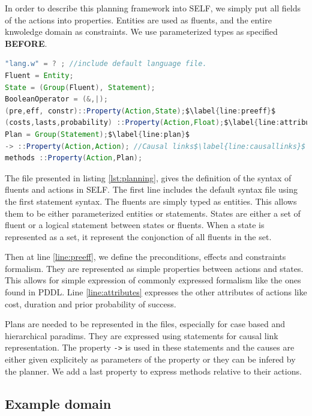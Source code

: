 \documentclass[11pt,a4paper,twoside,openright,titlepage,numbers=noenddot,headinclude,cleardoublepage=empty,openany]{scrreprt}
\theoremstyle{plain}
\theoremstyle{definition}
\theoremstyle{remark}
\newcommand{\passthrough}[1]{#1}
\begin{document}
In order to describe this planning framework into SELF, we simply put
all fields of the actions into properties. Entities are used as fluents,
and the entire knwoledge domain as constraints. We use parameterized
types as specified \textbf{BEFORE}.

\begin{lstlisting}[language=Java, caption={Content of the file "planning.w"}, escapechar={$}, label=lst:planning]
"lang.w" = ? ; //include default language file.
Fluent = Entity;
State = (Group(Fluent), Statement);
BooleanOperator = (&,|);
(pre,eff, constr)::Property(Action,State);$\label{line:preeff}$
(costs,lasts,probability) ::Property(Action,Float);$\label{line:attributes}$
Plan = Group(Statement);$\label{line:plan}$
-> ::Property(Action,Action); //Causal links$\label{line:causallinks}$
methods ::Property(Action,Plan);
\end{lstlisting}

The file presented in listing \ref{lst:planning}, gives the definition
of the syntax of fluents and actions in SELF. The first line includes
the default syntax file using the first statement syntax. The fluents
are simply typed as entities. This allows them to be either
parameterized entities or statements. States are either a set of fluent
or a logical statement between states or fluents. When a state is
represented as a set, it represent the conjonction of all fluents in the
set.

Then at line \ref{line:preeff}, we define the preconditions, effects and
constraints formalism. They are represented as simple properties between
actions and states. This allows for simple expression of commonly
expressed formalism like the ones found in PDDL.
Line \ref{line:attributes} expresses the other attributes of actions
like cost, duration and prior probability of success.

Plans are needed to be represented in the files, especially for case
based and hierarchical paradims. They are expressed using statements for
causal link representation. The property \passthrough{\lstinline!->!} is
used in these statements and the causes are either given explicitely as
parameters of the property or they can be infered by the planner. We add
a last property to express methods relative to their actions.

\hypertarget{example-domain}{%
\subsection{Example domain}\label{example-domain}}
\end{document}
